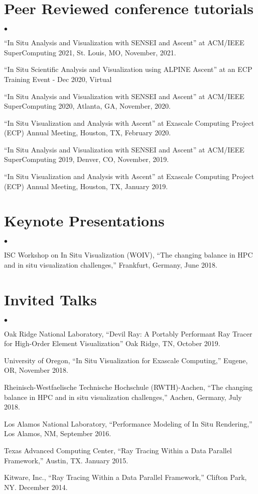 \documentclass[margin,line]{res}
\newenvironment{list2}{
  \begin{list}{$\bullet$}{%
      \setlength{\itemsep}{0in}
      \setlength{\parsep}{0in} \setlength{\parskip}{0in}
      \setlength{\topsep}{0in} \setlength{\partopsep}{0in}
      \setlength{\leftmargin}{0.2in}}}{\end{list}}
\begin{document}
\begin{resume}
\section{\sc Peer Reviewed conference tutorials}
\begin{list2}
	\item ``In Situ Analysis and Visualization with SENSEI and Ascent'' at ACM/IEEE SuperComputing 2021, St. Louis, MO, November, 2021.
  \item ``In Situ Scientific Analysis and Visualization using ALPINE Ascent'' at an ECP Training Event - Dec 2020, Virtual
	\item ``In Situ Analysis and Visualization with SENSEI and Ascent'' at ACM/IEEE SuperComputing 2020, Atlanta, GA, November, 2020.
	\item ``In Situ Visualization and Analysis with Ascent'' at Exascale Computing Project (ECP) Annual
	Meeting, Houston, TX, February 2020.
	\item ``In Situ Analysis and Visualization with SENSEI and Ascent'' at ACM/IEEE SuperComputing 2019, Denver, CO, November, 2019.
	\item ``In Situ Visualization and Analysis with Ascent'' at Exascale Computing Project (ECP) Annual
	Meeting, Houston, TX, January 2019.
\end{list2}

\section{\sc Keynote Presentations}
\begin{list2}
	\item ISC Workshop on In Situ Visualization (WOIV), ``The changing balance in HPC and in situ visualization challenges,''  Frankfurt, Germany, June 2018.
\end{list2}
\section{\sc Invited Talks}
\begin{list2}
	\item Oak Ridge National Laboratory, ``Devil Ray: A Portably Performant Ray Tracer for High-Order Element Visualization'' Oak Ridge, TN, October 2019.
	\item University of Oregon, ``In Situ Visualization for Exascale Computing,'' Eugene, OR, November 2018.
	\item Rheinisch-Westfaelische Technische Hochschule (RWTH)-Aachen, ``The changing balance in HPC and in situ visualization challenges,'' Aachen, Germany, July 2018.
	\item Los Alamos National Laboratory, “Performance Modeling of In Situ Rendering,” Los Alamos, NM, September 2016.
	\item Texas Advanced Computing Center, ``Ray Tracing Within a Data Parallel Framework,'' Austin, TX. January 2015.
	\item  Kitware, Inc., ``Ray Tracing Within a Data Parallel Framework,'' Clifton Park, NY. December 2014.
\end{list2}

\end{resume}
\end{document}
